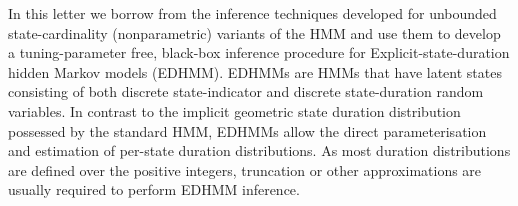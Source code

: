 In this letter we borrow from the inference techniques developed for unbounded state-cardinality (nonparametric) variants of the HMM and use them to develop a tuning-parameter free, black-box inference procedure for Explicit-state-duration hidden Markov models (EDHMM). EDHMMs are HMMs that have latent states consisting of both discrete state-indicator and discrete state-duration random variables.  In contrast to the implicit geometric state duration distribution possessed by the standard HMM, EDHMMs allow the direct parameterisation and estimation of per-state duration distributions. As most duration distributions are defined over the positive integers, truncation or other approximations are usually required to perform EDHMM inference.  
